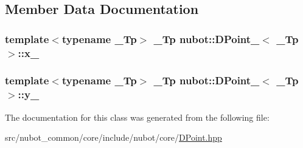 \subsection{Member Data Documentation}
\hypertarget{classnubot_1_1DPoint___a331b9929a84f05c009479ec70b88be37}{
\subsubsection[{x\-\_\-}]{\setlength{\rightskip}{0pt plus 5cm}template$<$typename \-\_\-\-Tp$>$ \-\_\-\-Tp {\bf nubot\-::\-D\-Point\-\_\-}$<$ \-\_\-\-Tp $>$\-::x\-\_\-}}\label{classnubot_1_1DPoint___a331b9929a84f05c009479ec70b88be37}
\hypertarget{classnubot_1_1DPoint___af48f202ad9774bb7bb51ffe0e9932e7e}{
\subsubsection[{y\-\_\-}]{\setlength{\rightskip}{0pt plus 5cm}template$<$typename \-\_\-\-Tp$>$ \-\_\-\-Tp {\bf nubot\-::\-D\-Point\-\_\-}$<$ \-\_\-\-Tp $>$\-::y\-\_\-}}\label{classnubot_1_1DPoint___af48f202ad9774bb7bb51ffe0e9932e7e}


The documentation for this class was generated from the following file\-:\begin{DoxyCompactItemize}
\item 
src/nubot\-\_\-common/core/include/nubot/core/\hyperlink{DPoint_8hpp}{D\-Point.\-hpp}\end{DoxyCompactItemize}
